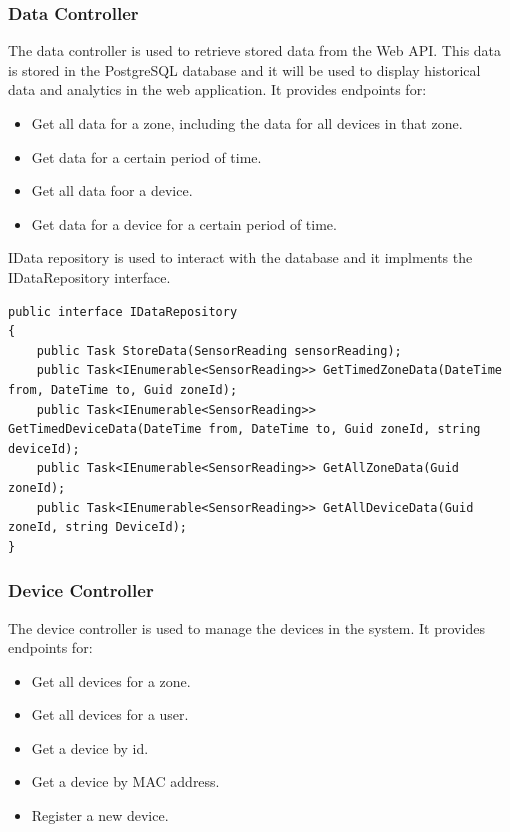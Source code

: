 \subsubsection{Data Controller}
The data controller is used to retrieve stored data from the Web API. This data is stored in the PostgreSQL database and
it will be used to display historical data and analytics in the web application.
It provides endpoints for:
\begin{itemize}
    \item Get all data for a zone, including the data for all devices in that zone.
    \item Get data for a certain period of time.
    \item Get all data foor a device.
    \item Get data for a device for a certain period of time.
\end{itemize}

IData repository is used to interact with the database and it implments the IDataRepository interface.
\begin{lstlisting}
public interface IDataRepository
{
    public Task StoreData(SensorReading sensorReading);
    public Task<IEnumerable<SensorReading>> GetTimedZoneData(DateTime from, DateTime to, Guid zoneId);
    public Task<IEnumerable<SensorReading>> GetTimedDeviceData(DateTime from, DateTime to, Guid zoneId, string deviceId);
    public Task<IEnumerable<SensorReading>> GetAllZoneData(Guid zoneId);
    public Task<IEnumerable<SensorReading>> GetAllDeviceData(Guid zoneId, string DeviceId);
}
\end{lstlisting}
\subsubsection{Device Controller}
The device controller is used to manage the devices in the system.
It provides endpoints for:
\begin{itemize}
    \item Get all devices for a zone.
    \item Get all devices for a user.
    \item Get a device by id.
    \item Get a device by MAC address.
    \item Register a new device.
\end{itemize}

